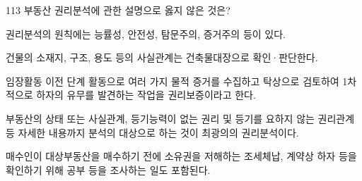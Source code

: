 \begin{question}{113}
부동산 권리분석에 관한 설명으로 옳지 않은 것은?
\begin{choices}
  \item 권리분석의 원칙에는 능률성, 안전성, 탐문주의, 증거주의 등이 있다.
  \item 건물의 소재지, 구조, 용도 등의 사실관계는 건축물대장으로 확인·판단한다.
  \item 임장활동 이전 단계 활동으로 여러 가지 물적 증거를 수집하고 탁상으로 검토하여 1차적으로 하자의 유무를 발견하는 작업을 권리보증이라고 한다.
  \item 부동산의 상태 또는 사실관계, 등기능력이 없는 권리 및 등기를 요하지 않는 권리관계 등 자세한 내용까지 분석의 대상으로 하는 것이 최광의의 권리분석이다.
  \item 매수인이 대상부동산을 매수하기 전에 소유권을 저해하는 조세체납, 계약상 하자 등을 확인하기 위해 공부 등을 조사하는 일도 포함된다.
\end{choices}
\end{question}
